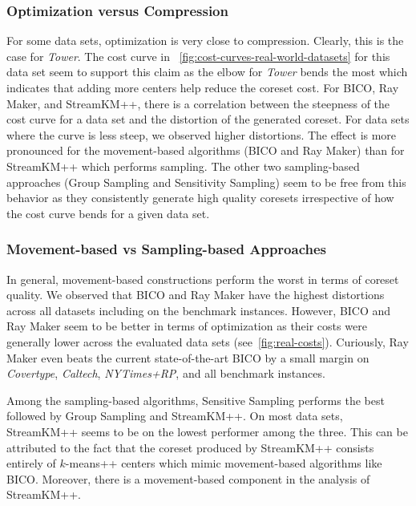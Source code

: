 \subsubsection*{Optimization versus Compression}
For some data sets, optimization is very close to compression. 
Clearly, this is the case for \textit{Tower}. The cost curve in ~\cref{fig:cost-curves-real-world-datasets} for this data set seem to support this claim as the elbow for \textit{Tower} bends the most which indicates that adding more centers help reduce the coreset cost. For BICO, Ray Maker, and StreamKM++, there is a correlation between the steepness of the cost curve for a data set and the distortion of the generated coreset. For data sets where the curve is less steep, we observed higher distortions. The effect is more pronounced for the movement-based algorithms (BICO and Ray Maker) than for StreamKM++ which performs sampling. The other two sampling-based approaches (Group Sampling and Sensitivity Sampling) seem to be free from this behavior as they consistently generate high quality coresets irrespective of how the cost curve bends for a given data set.

\subsubsection*{Movement-based vs Sampling-based Approaches}
In general, movement-based constructions perform the worst in terms of coreset quality. We observed that BICO and Ray Maker have the highest distortions across all datasets including on the benchmark instances. However, BICO and Ray Maker seem to be better in terms of optimization as their costs were generally lower across the evaluated data sets (see~\cref{fig:real-costs}). Curiously, Ray Maker even beats the current state-of-the-art BICO by a small margin on   \textit{Covertype}, \textit{Caltech}, \textit{NYTimes+RP}, and all benchmark instances. 

Among the sampling-based algorithms, Sensitive Sampling performs the best followed by Group Sampling and StreamKM++. On most data sets, StreamKM++ seems to be on the lowest performer among the three. This can be attributed to the fact that the coreset produced by StreamKM++ consists entirely of $k$-means++ centers which mimic movement-based algorithms like BICO. Moreover, there is a movement-based component in the analysis of StreamKM++.





